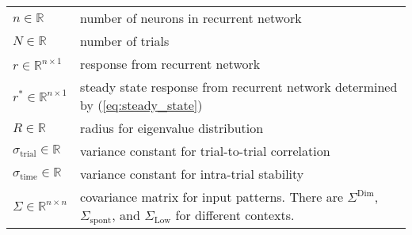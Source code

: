 \documentclass[11pt]{article}
\begin{document}
\begin{table}[H]
\begin{tabularx}{\textwidth}{lX}
			$n \in \mathbb{R}$  & number of neurons in recurrent network \\
			
			$N \in \mathbb{R}$ & number of trials \\
			
			$r \in \mathbb{R}^{n \times 1}$ & response from recurrent network \\
			
			
			$r^* \in \mathbb{R}^{n \times 1}$ & steady state response from recurrent network determined by (\ref{eq:steady_state}) \\
			
			$R \in \mathbb{R}$  & radius for eigenvalue distribution \\
			
			
			
			
			
			$\sigma_{\text{trial}} \in \mathbb{R}$ & variance constant for trial-to-trial correlation \\
			
			$\sigma_{\text{time}} \in \mathbb{R}$ & variance constant for intra-trial stability \\
			
			$\Sigma \in \mathbb{R}^{n \times n}$ & covariance matrix for input patterns. There are $\Sigma^{\text{Dim}}$, $\Sigma_{\text{spont}}$, and $\Sigma_{\text{Low}}$ for different contexts.\\
			

\end{tabularx}
\end{table}
\end{document}
